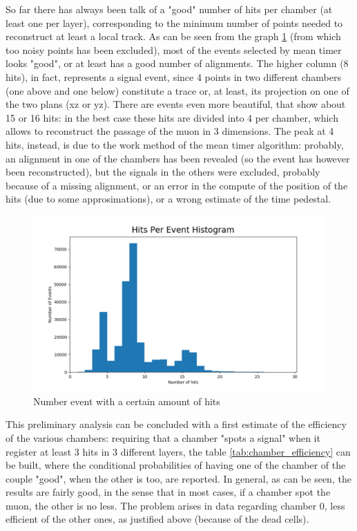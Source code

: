\documentclass[a4paper,11pt]{book}
\begin{document}
So far there has always been talk of a "good" number of hits per chamber (at least one per layer), corresponding to the minimum number of points needed to reconstruct at least a local track. As can be seen from the graph \ref{fig:hits_per_event} (from which too noisy points has been excluded), most of the events selected by mean timer looks "good", or at least has a good number of alignments. The higher column (8 hits), in fact, represents a signal event, since 4 points in two different chambers (one above and one below) constitute a trace or, at least, its projection on one of the two plans (xz or yz). There are events even more beautiful, that show about 15 or 16 hits: in the best case these hits are divided into 4 per chamber, which allows to reconstruct the passage of the muon in 3 dimensions.
The peak at 4 hits, instead, is due to the work method of the mean timer algorithm: probably, an alignment in one of the chambers has been revealed (so the event has however been reconstructed), but the signals in the others were excluded, probably because of a missing alignment, or an error in the compute of the position of the hits (due to some approsimations), or a wrong estimate of the time pedestal.\\

\begin{figure}[hbtp]
\centering
\includegraphics[scale=0.5]{pictures/Hits_per_event.pdf}
\caption{Number event with a certain amount of hits}
\label{fig:hits_per_event}
\end{figure}

This preliminary analysis can be concluded with a first estimate of the efficiency of the various chambers: requiring that a chamber "spots a signal" when it register at least 3 hits in 3 different layers, the table \ref{tab:chamber_efficiency} can be built, where the conditional probabilities of having one of the chamber of the couple "good", when the other is too, are reported. In general, as can be seen, the results are fairly good, in the sense that in most cases, if a chamber spot the muon, the other is no less. The problem arises in data regarding chamber 0, less efficient of the other ones, as justified above (because of the dead cells). \\
\end{document}
